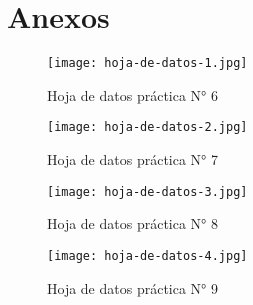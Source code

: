 \section{Anexos}

\begin{figure}[ht]
    \centering
    \texttt{[image: hoja-de-datos-1.jpg]}
    \caption{Hoja de datos práctica N° 6}
    \label{fig:hoja-de-datos-1}
\end{figure}

\begin{figure}[ht]
    \centering
    \texttt{[image: hoja-de-datos-2.jpg]}
    \caption{Hoja de datos práctica N° 7}
    \label{fig:hoja-de-datos-2}
\end{figure}

\begin{figure}[ht]
    \centering
    \texttt{[image: hoja-de-datos-3.jpg]}
    \caption{Hoja de datos práctica N° 8}
    \label{fig:hoja-de-datos-3}
\end{figure}


\begin{figure}[ht]
    \centering
    \texttt{[image: hoja-de-datos-4.jpg]}
    \caption{Hoja de datos práctica N° 9}
    \label{fig:hoja-de-datos-4}
\end{figure}



% 

% 
